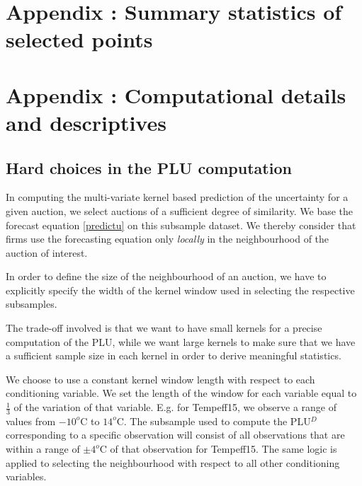  \section{Appendix : Summary statistics of selected points}
\label{tablestomatch}










\section{Appendix : Computational details and descriptives}

\subsection{Hard choices in the PLU computation}
\label{hardchoicePLU}

In computing the multi-variate kernel based prediction of the uncertainty for a given auction, we select auctions of a sufficient degree of similarity. We base the forecast equation \ref{predictu} on this subsample dataset. We thereby consider that firms use the forecasting equation only \textit{locally} in the neighbourhood of the auction of interest. 

In order to define the size of the neighbourhood of an auction, we have to explicitly specify the width of the kernel window used in selecting the respective subsamples. 



The trade-off involved is that we want to have small kernels for a precise computation of the PLU, while we want large kernels to make sure that we have a sufficient sample size in each kernel in order to derive meaningful statistics. 

We choose to use a constant kernel window length with respect to each conditioning variable. We set the length of the window for each variable equal to $\frac{1}{3}$ of the variation of that variable. E.g. for Tempeff15, we observe a range of values from $-10^o$C to $14^o$C. The subsample used to compute the PLU$^D$ corresponding to a specific observation will consist of all observations that are within a range of $\pm 4^o$C of that observation for Tempeff15. The same logic is applied to selecting the neighbourhood with respect to all other conditioning variables. 

